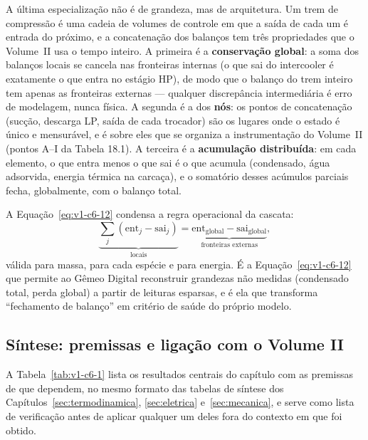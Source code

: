 \documentclass[12pt,a4paper]{article}
\numberwithin{equation}{section}
\numberwithin{table}{section}
\numberwithin{figure}{section}
\begin{document}
A última especialização não é de grandeza, mas de arquitetura. Um trem de
compressão é uma cadeia de volumes de controle em que a saída de cada um é
entrada do próximo, e a concatenação dos balanços tem três propriedades que o
Volume~II usa o tempo inteiro. A primeira é a \textbf{conservação global}: a
soma dos balanços locais se cancela nas fronteiras internas (o que sai do
intercooler é exatamente o que entra no estágio HP), de modo que o balanço do
trem inteiro tem apenas as fronteiras externas --- qualquer discrepância
intermediária é erro de modelagem, nunca física. A segunda é a dos
\textbf{nós}: os pontos de concatenação (sucção, descarga LP, saída de cada
trocador) são os lugares onde o estado é único e mensurável, e é sobre eles
que se organiza a instrumentação do Volume~II (pontos A--I da Tabela 18.1). A
terceira é a \textbf{acumulação distribuída}: em cada elemento, o que entra
menos o que sai é o que acumula (condensado, água adsorvida, energia térmica
na carcaça), e o somatório desses acúmulos parciais fecha, globalmente, com o
balanço total.

A Equação~\eqref{eq:v1-c6-12} condensa a regra operacional da cascata:
\begin{equation}\label{eq:v1-c6-12}
\underbrace{\sum_j \left( \text{ent}_j - \text{sai}_j \right)}_{\text{locais}} =
\underbrace{\text{ent}_{\text{global}} - \text{sai}_{\text{global}}}_{\text{fronteiras externas}} ,
\end{equation}
válida para massa, para cada espécie e para energia. É a
Equação~\eqref{eq:v1-c6-12} que permite ao Gêmeo Digital reconstruir grandezas
não medidas (condensado total, perda global) a partir de leituras esparsas, e
é ela que transforma ``fechamento de balanço'' em critério de saúde do
próprio modelo.

\subsection{Síntese: premissas e ligação com o Volume
II}\label{sub:v1-c6-sintese}

A Tabela~\ref{tab:v1-c6-1} lista os resultados centrais do capítulo com as
premissas de que dependem, no mesmo formato das tabelas de síntese dos
Capítulos~\ref{sec:termodinamica}, \ref{sec:eletrica} e~\ref{sec:mecanica},
e serve como lista de verificação antes de aplicar qualquer um deles fora do
contexto em que foi obtido.
\end{document}
